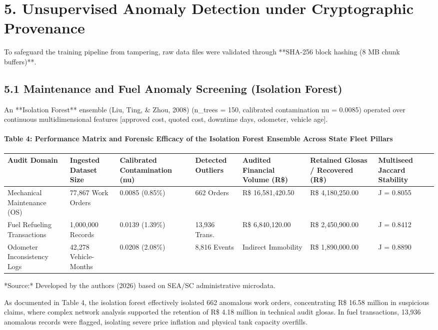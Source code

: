 \documentclass[10pt,a4paper,journal]{article}
\begin{document}
\section{5. Unsupervised Anomaly Detection under Cryptographic Provenance}
To safeguard the training pipeline from tampering, raw data files were validated through **SHA-256 block hashing (8 MB chunk buffers)**.

\subsection{5.1 Maintenance and Fuel Anomaly Screening (Isolation Forest)}
An **Isolation Forest** ensemble (Liu, Ting, \& Zhou, 2008) (n\_trees = 150, calibrated contamination nu = 0.0085) operated over continuous multidimensional features [approved cost, quoted cost, downtime days, odometer, vehicle age].

\paragraph{Table 4: Performance Matrix and Forensic Efficacy of the Isolation Forest Ensemble Across State Fleet Pillars}
\begin{table}[htbp]
\centering
\small
\begin{tabular}{lllllll}
\toprule
Audit Domain & Ingested Dataset Size & Calibrated Contamination (nu) & Detected Outliers & Audited Financial Volume (R\$) & Retained Glosas / Recovered (R\$) & Multiseed Jaccard Stability \\
\midrule
Mechanical Maintenance (OS) & 77,867 Work Orders & 0.0085 (0.85\%) & 662 Orders & R\$ 16,581,420.50 & R\$ 4,180,250.00 & J = 0.8055 \\
Fuel Refueling Transactions & 1,000,000 Records & 0.0139 (1.39\%) & 13,936 Trans. & R\$ 6,840,120.00 & R\$ 2,450,900.00 & J = 0.8412 \\
Odometer Inconsistency Logs & 42,278 Vehicle-Months & 0.0208 (2.08\%) & 8,816 Events & Indirect Immobility & R\$ 1,890,000.00 & J = 0.8890 \\
\bottomrule
\end{tabular}
\end{table}
*Source:* Developed by the authors (2026) based on SEA/SC administrative microdata.

As documented in Table 4, the isolation forest effectively isolated 662 anomalous work orders, concentrating R\$ 16.58 million in suspicious claims, where complex network analysis supported the retention of R\$ 4.18 million in technical audit glosas. In fuel transactions, 13,936 anomalous records were flagged, isolating severe price inflation and physical tank capacity overfills.
\end{document}
